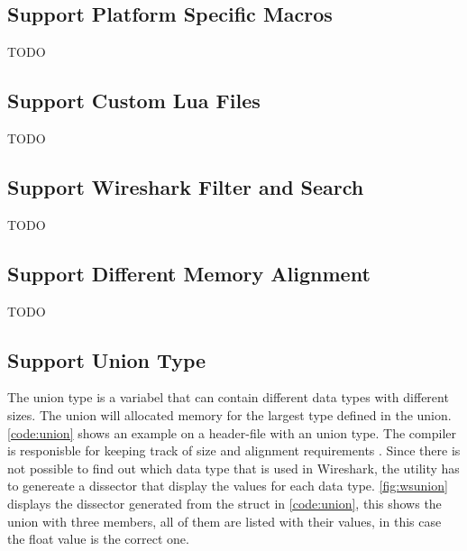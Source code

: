 \subsection{Support Platform Specific Macros}
TODO

\subsection{Support Custom Lua Files}
TODO

\subsection{Support Wireshark Filter and Search}
TODO

\subsection{Support Different Memory Alignment}
TODO

\subsection{Support Union Type}
The union type is a variabel that can contain different data types with 
different sizes. The union will allocated memory for the largest type defined 
in the union. \autoref{code:union} shows an example on a header-file with an 
union type. The compiler is responisble for keeping track of size and 
alignment requirements\cite[p.147]{Kerninghan1988} . Since there is not 
possible to find out which data type that is used in Wireshark, the utility 
has to genereate a dissector that display the values for each data type. 
\autoref{fig:wsunion} displays the dissector generated from the struct in 
\autoref{code:union}, this shows the union with three members, all of them are 
listed with their values, in this case the float value is the correct one.

